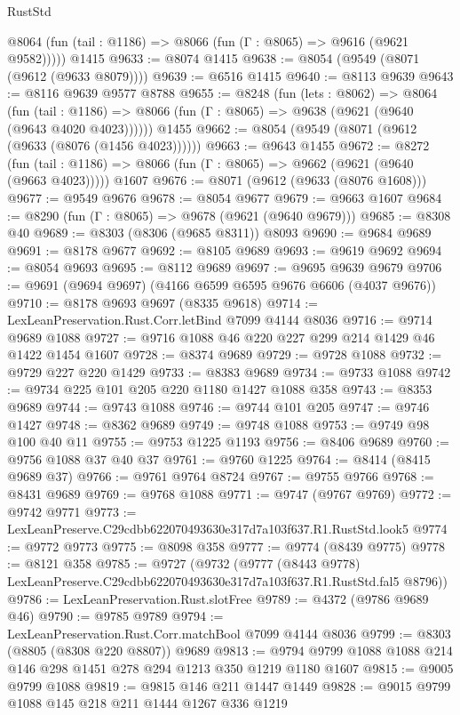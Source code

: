 \begin{lexlean}{RustStd}
\begin{coremodule}
      @8064 (fun (tail : @1186) => @8066 (fun (Γ : @8065) => @9616 (@9621 @9582)))))
    @1415
@9633 := @8074 @1415
@9638 := @8054 (@9549 (@8071 (@9612 (@9633 @8079))))
@9639 := @6516 @1415
@9640 := @8113 @9639
@9643 := @8116 @9639 @9577 @8788
@9655 := @8248
    (fun (lets : @8062) =>
    @8064
      (fun (tail : @1186) => @8066 (fun (Γ : @8065) => @9638 (@9621 (@9640 (@9643 @4020 @4023))))))
    @1455
@9662 := @8054 (@9549 (@8071 (@9612 (@9633 (@8076 (@1456 @4023))))))
@9663 := @9643 @1455
@9672 := @8272
    (fun (tail : @1186) => @8066 (fun (Γ : @8065) => @9662 (@9621 (@9640 (@9663 @4023)))))
    @1607
@9676 := @8071 (@9612 (@9633 (@8076 @1608)))
@9677 := @9549 @9676
@9678 := @8054 @9677
@9679 := @9663 @1607
@9684 := @8290 (fun (Γ : @8065) => @9678 (@9621 (@9640 @9679)))
@9685 := @8308 @40
@9689 := @8303 (@8306 (@9685 @8311)) @8093
@9690 := @9684 @9689
@9691 := @8178 @9677
@9692 := @8105 @9689
@9693 := @9619 @9692
@9694 := @8054 @9693
@9695 := @8112 @9689
@9697 := @9695 @9639 @9679
@9706 := @9691 (@9694 @9697) (@4166 @6599 @6595 @9676 @6606 (@4037 @9676))
@9710 := @8178 @9693 @9697 (@8335 @9618)
@9714 := LexLeanPreservation.Rust.Corr.letBind @7099 @4144 @8036
@9716 := @9714 @9689 @1088
@9727 := @9716 @1088 @46 @220 @227 @299 @214 @1429 @46 @1422 @1454 @1607
@9728 := @8374 @9689
@9729 := @9728 @1088
@9732 := @9729 @227 @220 @1429
@9733 := @8383 @9689
@9734 := @9733 @1088
@9742 := @9734 @225 @101 @205 @220 @1180 @1427 @1088 @358
@9743 := @8353 @9689
@9744 := @9743 @1088
@9746 := @9744 @101 @205
@9747 := @9746 @1427
@9748 := @8362 @9689
@9749 := @9748 @1088
@9753 := @9749 @98 @100 @40 @11
@9755 := @9753 @1225 @1193
@9756 := @8406 @9689
@9760 := @9756 @1088 @37 @40 @37
@9761 := @9760 @1225
@9764 := @8414 (@8415 @9689 @37)
@9766 := @9761 @9764 @8724
@9767 := @9755 @9766
@9768 := @8431 @9689
@9769 := @9768 @1088
@9771 := @9747 (@9767 @9769)
@9772 := @9742 @9771
@9773 := LexLeanPreserve.C29cdbb622070493630e317d7a103f637.R1.RustStd.look5
@9774 := @9772 @9773
@9775 := @8098 @358
@9777 := @9774 (@8439 @9775)
@9778 := @8121 @358
@9785 := @9727
    (@9732
      (@9777 (@8443 @9778) LexLeanPreserve.C29cdbb622070493630e317d7a103f637.R1.RustStd.fal5 @8796))
@9786 := LexLeanPreservation.Rust.slotFree
@9789 := @4372 (@9786 @9689 @46)
@9790 := @9785 @9789
@9794 := LexLeanPreservation.Rust.Corr.matchBool @7099 @4144 @8036
@9799 := @8303 (@8805 (@8308 @220 @8807)) @9689
@9813 := @9794 @9799 @1088 @1088 @214 @146 @298 @1451 @278 @294 @1213 @350 @1219 @1180 @1607
@9815 := @9005 @9799 @1088
@9819 := @9815 @146 @211 @1447 @1449
@9828 := @9015 @9799 @1088 @145 @218 @211 @1444 @1267 @336 @1219

\end{coremodule}
\end{lexlean}
